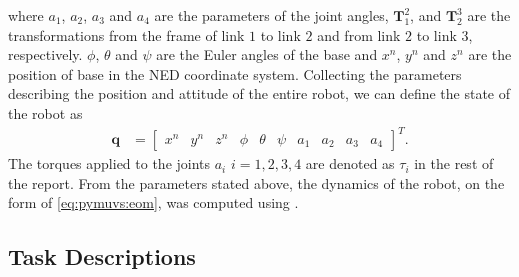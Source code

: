 where $a_1$, $a_2$, $a_3$ and $a_4$ are the parameters of the joint angles,
$\bm{T}_1^2$, and $\bm{T}_2^3$ are the transformations from the frame of link $1$ to link $2$
and from link $2$ to link $3$, respectively. $\phi$, $\theta$ and $\psi$ are the
Euler angles of the base and $x^n$, $y^n$ and $z^n$ are the position of base
in the NED coordinate system. Collecting the parameters describing the position
and attitude of the entire robot, we can define the state of the robot as
\begin{align}
    \bm{q} &= \begin{bmatrix} x^n & y^n & z^n & \phi & \theta & \psi & a_1 & a_2 & a_3 & a_4 \end{bmatrix}^T.
\end{align}
The torques applied to the joints $a_i$ $i=1,2,3,4$ are denoted as $\tau_i$ in
the rest of the report.
From the parameters stated above, the dynamics of the robot, on the form of
\autoref{eq:pymuvs:eom}, was computed using \pymuvs.

\subsection{Task Descriptions}

